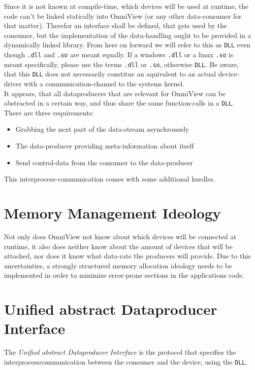 \documentclass{scrreprt}
\begin{document}
Since it is not known at compile-time, which devices will be used at runtime, the code can't be linked statically into OmniView (or any other data-\gls{consumer} for that matter). 
Therefor an interface shall be defined, that gets used by the consumer, but the implementation of the data-handling ought to be provided in a dynamically linked library. 
From here on forward we will refer to this as \lstinline|DLL| even though \lstinline|.dll| and \lstinline|.so| are meant equally. 
If a windows \lstinline|.dll| or a linux \lstinline|.so| is meant specifically, please use the terms \lstinline|.dll| or \lstinline|.so|, otherwise \lstinline|DLL|. 
Be aware, that this \lstinline|DLL| does not necessarily constitue an aquivalent to an actual device-driver with a communication-channel to the systems kernel.
\\
It appears, that all dataproducers that are relevant for OmniView can be abstracted in a certain way, and thus share the same function-calls in a \lstinline|DLL|.
There are three requirements:
\begin{itemize}
    \item Grabbing the next part of the data-stream asynchronusly
    \item The data-producer providing meta-information about itself 
    \item Send control-data from the consumer to the data-producer
\end{itemize}
This interprocess-communication comes with some additional hurdles.

\section{Memory Management Ideology}
Not only does OmniView not know about which devices will be connected at runtime, it also does neither know about the amount of devices that will be attached, nor does it know what data-rate the producers will provide.
Due to this uncertainties, a strongly structured memory allocation ideology needs to be implemented in order to minimize error-prone sections in the applications code.


\section[UaDI]{Unified abstract Data\-producer Interface}
The \textit{Unified abstract Data\-producer Interface} is the protocol that specifies the interprocess\-communication between the con\-sumer and the device, using the \lstinline|DLL|. 
\end{document}
